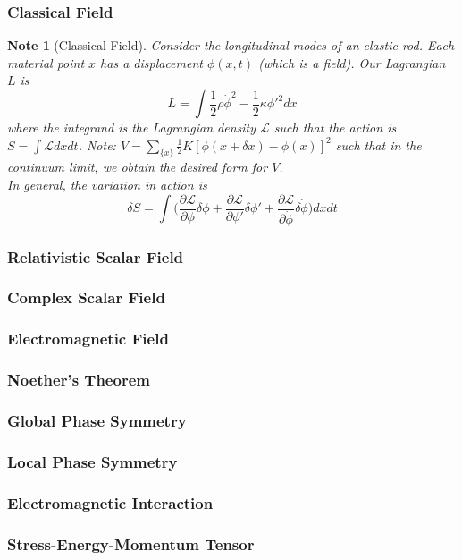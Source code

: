 \documentclass[a4paper]{article}
\newtheorem{note}{Note}[section]
\theoremstyle{new}
\begin{document}
\subsubsection{Classical Field}
\begin{note}[Classical Field]
Consider the longitudinal modes of an elastic rod. Each material point $x$ has a displacement $\phi(x,t)$ (which is a field). Our Lagrangian $L$ is 
$$L=\int\frac{1}{2}\rho\dot{\phi}^2-\frac{1}{2}\kappa\phi'^2dx$$
where the integrand is the Lagrangian density $\mathcal{L}$ such that the action is $S=\int\mathcal{L}dxdt$. Note: $V=\sum_{\{x\}}\frac{1}{2}K[\phi(x+\delta x)-\phi(x)]^2$ such that in the continuum limit, we obtain the desired form for $V$.\\[5pt]
In general, the variation in action is
$$\delta S=\int\bigg(\frac{\partial\mathcal{L}}{\partial\phi}\delta\phi+\frac{\partial\mathcal{L}}{\partial\phi'}\delta\phi'+\frac{\partial\mathcal{L}}{\partial\dot{\phi}}\delta\dot{\phi}\bigg)dxdt$$
\end{note}
\subsubsection{Relativistic Scalar Field}
\newpage
\subsubsection{Complex Scalar Field}
\subsubsection{Electromagnetic Field}
\newpage
\subsubsection{Noether's Theorem}
\subsubsection{Global Phase Symmetry}
\subsubsection{Local Phase Symmetry}
\subsubsection{Electromagnetic Interaction}
\subsubsection{Stress-Energy-Momentum Tensor}
\end{document}
